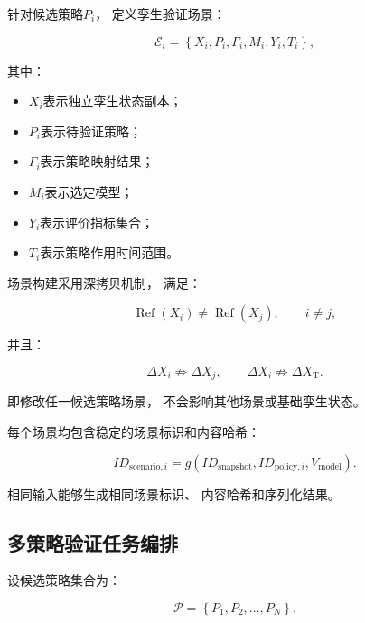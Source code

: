 \documentclass[lang=cn,12pt]{elegantbook}
\begin{document}
针对候选策略$P_i$，
定义孪生验证场景：

\begin{equation}
\mathcal{E}_i
=
\left\{
X_i,
P_i,
\Gamma_i,
M_i,
Y_i,
T_i
\right\},
\label{eq:twin_validation_scenario}
\end{equation}

其中：

\begin{itemize}
    \item $X_i$表示独立孪生状态副本；
    \item $P_i$表示待验证策略；
    \item $\Gamma_i$表示策略映射结果；
    \item $M_i$表示选定模型；
    \item $Y_i$表示评价指标集合；
    \item $T_i$表示策略作用时间范围。
\end{itemize}

场景构建采用深拷贝机制，
满足：

\begin{equation}
\operatorname{Ref}(X_i)
\neq
\operatorname{Ref}(X_j),
\qquad
i\neq j,
\label{eq:twin_scenario_reference_isolation}
\end{equation}

并且：

\begin{equation}
\Delta X_i
\not\Rightarrow
\Delta X_j,
\qquad
\Delta X_i
\not\Rightarrow
\Delta X_{\mathrm{T}}.
\label{eq:twin_scenario_state_isolation}
\end{equation}

即修改任一候选策略场景，
不会影响其他场景或基础孪生状态。

每个场景均包含稳定的场景标识和内容哈希：

\begin{equation}
ID_{\mathrm{scenario},i}
=
g
\left(
ID_{\mathrm{snapshot}},
ID_{\mathrm{policy},i},
V_{\mathrm{model}}
\right).
\label{eq:twin_scenario_id}
\end{equation}

相同输入能够生成相同场景标识、
内容哈希和序列化结果。


\subsection*{多策略验证任务编排}

设候选策略集合为：

\begin{equation}
\mathcal{P}
=
\left\{
P_1,
P_2,
\ldots,
P_N
\right\}.
\end{equation}
\end{document}
